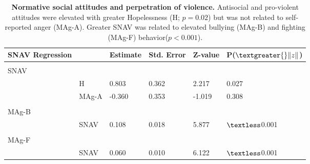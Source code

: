 \documentclass[utf8]{article}
\begin{document}
\begin{table}[]
\begin{tabular}{llllll}
SNAV Regression &       & Estimate & Std. Error & Z-value & P($\textgreater{}\|z\|$) \\ \hline
                      &       &          &            &         &                          \\
SNAV                  &       &          &            &         &                          \\
                      & H     & 0.803    & 0.362      & 2.217   & 0.027                    \\
                      & MAg-A & -0.360   & 0.353      & -1.019  & 0.308                    \\
                      &       &          &            &         &                          \\
MAg-B                 &       &          &            &         &                          \\
                      & SNAV  & 0.108    & 0.018      & 5.877   & $\textless$0.001                    \\
                      &       &          &            &         &                          \\
MAg-F                 &       &          &            &         &                          \\
                      & SNAV  & 0.060    & 0.010      & 6.122   & $\textless$0.001                   
\end{tabular}
\caption{\textbf{Normative social attitudes and perpetration of violence.} Antisocial and pro-violent attitudes were elevated with greater Hopelessness (H; $p=0.02$) but was not related to self-reported anger (MAg-A). Greater SNAV was related to elevated bullying (MAg-B) and fighting (MAg-F) behavior($p<0.001$). \label{tab:12}}
\end{table}
\end{document}
